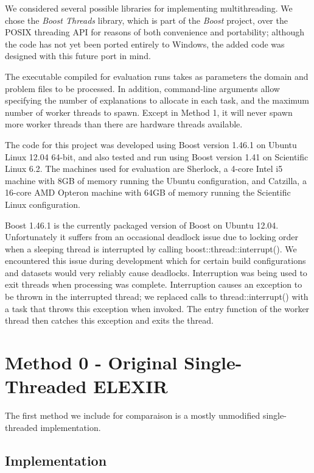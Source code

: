 \documentclass[12pt,twoside,abbrevs,msc,ai,notimes,logo,sansheadings]{infthesis}
\begin{document}
  We considered several possible libraries for implementing multithreading. We chose the \emph{Boost Threads} library, which is part of the \emph{Boost} project, over the POSIX threading API for reasons of both convenience and portability; although the code has not yet been ported entirely to Windows, the added code was designed with this future port in mind.
  
  The executable compiled for evaluation runs takes as parameters the domain and problem files to be processed. In addition, command-line arguments allow specifying the number of explanations to allocate in each task, and the maximum number of worker threads to spawn. Except in Method 1, it will never spawn more worker threads than there are hardware threads available.
  
  The code for this project was developed using Boost version 1.46.1 on Ubuntu Linux 12.04 64-bit, and also tested and run using Boost version 1.41 on Scientific Linux 6.2. The machines used for evaluation are Sherlock, a 4-core Intel i5 machine with 8GB of memory running the Ubuntu configuration, and Catzilla, a 16-core AMD Opteron machine with 64GB of memory running the Scientific Linux configuration.
  
  Boost 1.46.1 is the currently packaged version of Boost on Ubuntu 12.04. Unfortunately it suffers from an occasional deadlock issue due to locking order when a sleeping thread is interrupted by calling boost::thread::interrupt(). We encountered this issue during development which for certain build configurations and datasets would very reliably cause deadlocks. Interruption was being used to exit threads when processing was complete. Interruption causes an exception to be thrown in the interrupted thread; we replaced calls to thread::interrupt() with a task that throws this exception when invoked. The entry function of the worker thread then catches this exception and exits the thread.
  
  \chapter {Method 0 - Original Single-Threaded ELEXIR}
  
  The first method we include for comparaison is a mostly unmodified single-threaded implementation.
  
  \section {Implementation}
  
\end{document}
